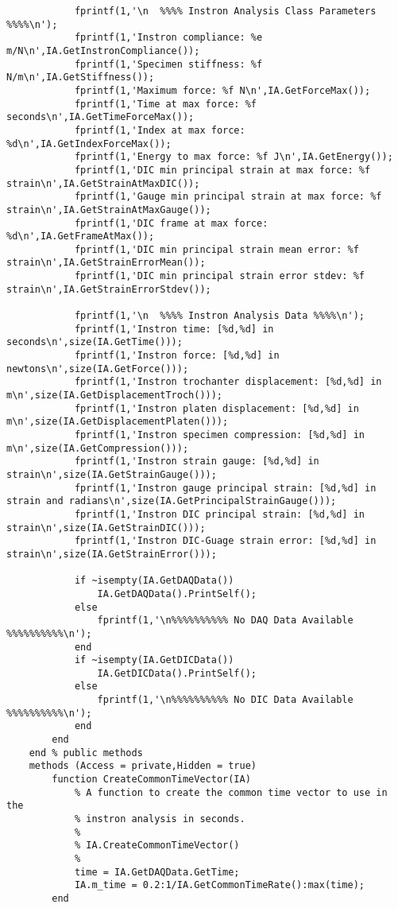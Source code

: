 \begin{lstlisting}
            fprintf(1,'\n  %%%% Instron Analysis Class Parameters %%%%\n');
            fprintf(1,'Instron compliance: %e m/N\n',IA.GetInstronCompliance());
            fprintf(1,'Specimen stiffness: %f N/m\n',IA.GetStiffness());
            fprintf(1,'Maximum force: %f N\n',IA.GetForceMax());                  
            fprintf(1,'Time at max force: %f seconds\n',IA.GetTimeForceMax());
            fprintf(1,'Index at max force: %d\n',IA.GetIndexForceMax());
            fprintf(1,'Energy to max force: %f J\n',IA.GetEnergy());
            fprintf(1,'DIC min principal strain at max force: %f strain\n',IA.GetStrainAtMaxDIC());
            fprintf(1,'Gauge min principal strain at max force: %f strain\n',IA.GetStrainAtMaxGauge());
            fprintf(1,'DIC frame at max force: %d\n',IA.GetFrameAtMax());
            fprintf(1,'DIC min principal strain mean error: %f strain\n',IA.GetStrainErrorMean());
            fprintf(1,'DIC min principal strain error stdev: %f strain\n',IA.GetStrainErrorStdev());
            
            fprintf(1,'\n  %%%% Instron Analysis Data %%%%\n');
            fprintf(1,'Instron time: [%d,%d] in seconds\n',size(IA.GetTime()));
            fprintf(1,'Instron force: [%d,%d] in newtons\n',size(IA.GetForce()));
            fprintf(1,'Instron trochanter displacement: [%d,%d] in m\n',size(IA.GetDisplacementTroch()));
            fprintf(1,'Instron platen displacement: [%d,%d] in m\n',size(IA.GetDisplacementPlaten()));
            fprintf(1,'Instron specimen compression: [%d,%d] in m\n',size(IA.GetCompression()));
            fprintf(1,'Instron strain gauge: [%d,%d] in strain\n',size(IA.GetStrainGauge()));
            fprintf(1,'Instron gauge principal strain: [%d,%d] in strain and radians\n',size(IA.GetPrincipalStrainGauge()));
            fprintf(1,'Instron DIC principal strain: [%d,%d] in strain\n',size(IA.GetStrainDIC()));
            fprintf(1,'Instron DIC-Guage strain error: [%d,%d] in strain\n',size(IA.GetStrainError()));
            
            if ~isempty(IA.GetDAQData())
                IA.GetDAQData().PrintSelf();
            else
                fprintf(1,'\n%%%%%%%%%% No DAQ Data Available %%%%%%%%%%\n');
            end
            if ~isempty(IA.GetDICData())
                IA.GetDICData().PrintSelf();
            else
                fprintf(1,'\n%%%%%%%%%% No DIC Data Available %%%%%%%%%%\n');
            end
        end
    end % public methods
    methods (Access = private,Hidden = true)
        function CreateCommonTimeVector(IA)
            % A function to create the common time vector to use in the
            % instron analysis in seconds.
            %
            % IA.CreateCommonTimeVector()
            %
            time = IA.GetDAQData.GetTime;
            IA.m_time = 0.2:1/IA.GetCommonTimeRate():max(time);
        end


\end{lstlisting}
